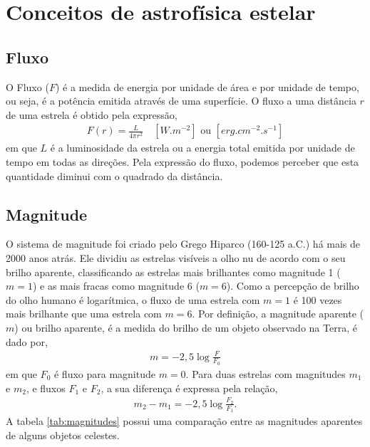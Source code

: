\section{Conceitos de astrofísica estelar}

\nocite{karttunenLivro}

\subsection{Fluxo}

O Fluxo ($F$) é a medida de energia por unidade de área e por unidade de tempo, ou seja, é a potência emitida através de uma superfície. O fluxo a uma distância $r$ de uma estrela é obtido pela expressão,
\begin{align}
F(r) = \frac{L}{4\pi r^2} \quad \left[ \si{W.m^{-2}}\right] \,\, \text{ou} \,\, \left[\si{erg.cm^{-2}.s^{-1}}\right] \label{eq:fluxo}
\end{align}
em que $L$ é a luminosidade da estrela ou a energia total emitida por unidade de tempo em todas as direções. Pela expressão do fluxo, podemos perceber que esta quantidade diminui com o quadrado da distância.

\subsection{Magnitude}

O sistema de magnitude foi criado pelo Grego Hiparco (160-125 a.C.) há mais de 2000 anos atrás. Ele dividiu as estrelas visíveis a olho nu de acordo com o seu brilho aparente, classificando as estrelas mais brilhantes como magnitude 1 ($m=1$) e as mais fracas como magnitude 6 ($m=6$). Como a percepção de brilho do olho humano é logarítmica, o fluxo de uma estrela com 
$m=1$ é 100 vezes mais brilhante que uma estrela com $m=6$. Por definição, a magnitude aparente ($m$) ou brilho aparente, é a medida do brilho de um objeto observado na Terra, é dado por,
\begin{align}
m = - 2,5 \log \frac{F}{F_0}
\end{align}
em que $F_0$ é fluxo para magnitude $m=0$. Para duas estrelas com magnitudes $m_1$ e $m_2$, e fluxos $F_1$ e $F_2$, a sua diferença é expressa pela relação,
\begin{align}
m_2 - m_1 = -2,5 \log \frac{F_2}{F_1}.
\end{align}
A tabela \ref{tab:magnitudes} possui uma comparação entre as magnitudes aparentes de alguns objetos celestes.

